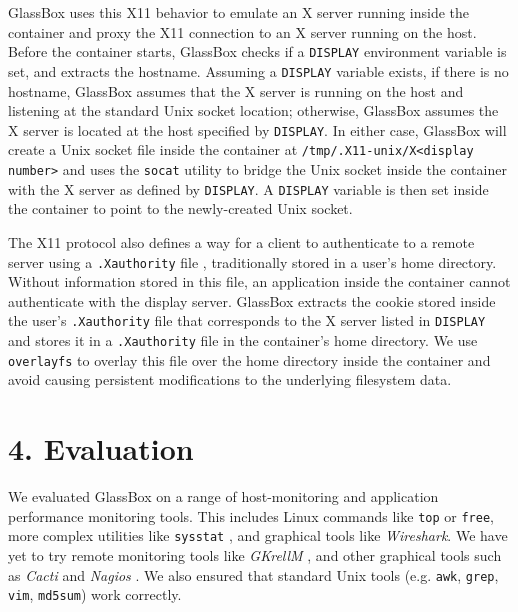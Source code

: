 \documentclass{proc}
\begin{document}
GlassBox uses this X11 behavior to emulate an X server running inside the container and proxy the X11 connection to an X server running on the host. Before the container starts, GlassBox checks if a \texttt{DISPLAY} environment variable is set, and extracts the hostname. Assuming a \texttt{DISPLAY} variable exists, if there is no hostname, GlassBox assumes that the X server is running on the host and listening at the standard Unix socket location; otherwise, GlassBox assumes the X server is located at the host specified by \texttt{DISPLAY}. In either case, GlassBox will create a Unix socket file inside the container at \texttt{/tmp/.X11-unix/X<display number>} and uses the \texttt{socat} utility \cite{socatman} to bridge the Unix socket inside the container with the X server as defined by \texttt{DISPLAY}. A \texttt{DISPLAY} variable is then set inside the container to point to the newly-created Unix socket.

The X11 protocol also defines a way for a client to authenticate to a remote server using a \texttt{.Xauthority} file \cite{xsecurityman}, traditionally stored in a user's home directory. Without information stored in this file, an application inside the container cannot authenticate with the display server. GlassBox extracts the cookie stored inside the user's \texttt{.Xauthority} file that corresponds to the X server listed in \texttt{DISPLAY} and stores it in a \texttt{.Xauthority} file in the container's home directory. We use \texttt{overlayfs} to overlay this file over the home directory inside the container and avoid causing persistent modifications to the underlying filesystem data.

\section*{4. Evaluation}
We evaluated GlassBox on a range of host-monitoring and application performance monitoring tools. This includes Linux commands like \texttt{top} or \texttt{free}, more complex utilities like \texttt{sysstat} \cite{sysstat}, and graphical tools like \textit{Wireshark}. We have yet to try remote monitoring tools like \textit{GKrellM} \cite{gkrellm}, and other graphical tools such as \textit{Cacti} \cite{cacti} and \textit{Nagios} \cite{nagios}. We also ensured that standard Unix tools (e.g. \texttt{awk}, \texttt{grep}, \texttt{vim}, \texttt{md5sum}) work correctly.
\end{document}
